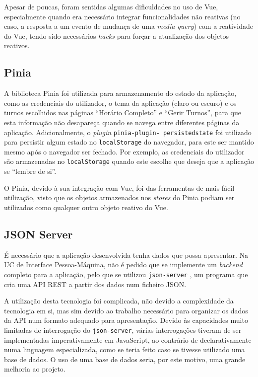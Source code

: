 \documentclass[12pt, a4paper]{article}
\begin{document}
Apesar de poucas, foram sentidas algumas dificuldades no uso de Vue, especialmente quando era
necessário integrar funcionalidades não reativas (no caso, a resposta a um evento de mudança de uma
\emph{media query}) com a reatividade do Vue, tendo sido necessários \emph{hacks} para forçar a
atualização dos objetos reativos.

\subsection{Pinia}

A biblioteca Pinia \cite{pinia} foi utilizada para armazenamento do estado da aplicação, como as
credenciais do utilizador, o tema da aplicação (claro ou escuro) e os turnos escolhidos nas páginas
``Horário Completo'' e ``Gerir Turnos'', para que esta informação não desapareça quando se navega
entre diferentes páginas da aplicação. Adicionalmente, o \emph{plugin}
\texttt{pinia-plugin- persistedstate} \cite{pinia-persistent} foi utilizado para persistir algum
estado no \texttt{localStorage} do navegador, para este ser mantido mesmo após o navegador ser
fechado. Por exemplo, as credenciais do utilizador são armazenadas no \texttt{localStorage} quando
este escolhe que deseja que a aplicação se ``lembre de si''.

O Pinia, devido à sua integração com Vue, foi das ferramentas de mais fácil utilização, visto que os
objetos armazenados nos \emph{stores} do Pinia podiam ser utilizados como qualquer outro objeto
reativo do Vue.

\subsection{JSON Server}

É necessário que a aplicação desenvolvida tenha dados que possa apresentar. Na UC de Interface
Pessoa-Máquina, não é pedido que se implemente um \emph{backend} completo para a aplicação, pelo que
se utilizou \texttt{json-server} \cite{json-server}, um programa que cria uma API REST a partir dos
dados num ficheiro JSON.

A utilização desta tecnologia foi complicada, não devido a complexidade da tecnologia em si, mas sim
devido ao trabalho necessário para organizar os dados da API num formato adequado para apresentação.
Devido às capacidades muito limitadas de interrogação do \texttt{json-server}, várias interrogações
tiveram de ser implementadas imperativamente em JavaScript, ao contrário de declarativamente numa
linguagem especializada, como se teria feito caso se tivesse utilizado uma base de dados. O uso de
uma base de dados seria, por este motivo, uma grande melhoria ao projeto.
\end{document}
